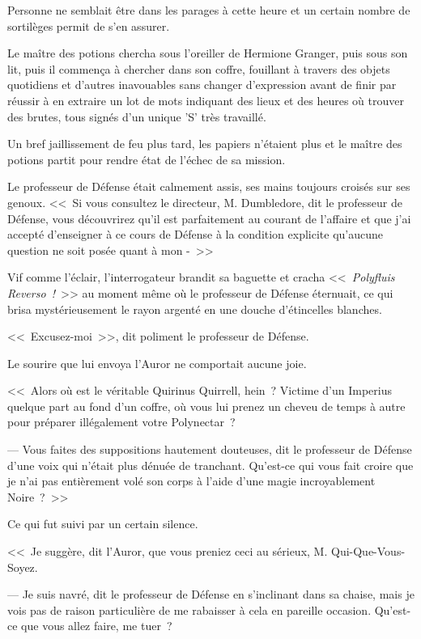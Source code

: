 Personne ne semblait être dans les parages à cette heure et un certain nombre de sortilèges permit de s'en assurer.

Le maître des potions chercha sous l'oreiller de Hermione Granger, puis sous son lit, puis il commença à chercher dans son coffre, fouillant à travers des objets quotidiens et d'autres inavouables sans changer d'expression avant de finir par réussir à en extraire un lot de mots indiquant des lieux et des heures où trouver des brutes, tous signés d'un unique 'S' très travaillé.

Un bref jaillissement de feu plus tard, les papiers n'étaient plus et le maître des potions partit pour rendre état de l'échec de sa mission.

\later

Le professeur de Défense était calmement assis, ses mains toujours croisés sur ses genoux. <<~Si vous consultez le directeur, M. Dumbledore, dit le professeur de Défense, vous découvrirez qu'il est parfaitement au courant de l'affaire et que j'ai accepté d'enseigner à ce cours de Défense à la condition explicite qu'aucune question ne soit posée quant à mon -~>>

Vif comme l'éclair, l'interrogateur brandit sa baguette et cracha <<~\emph{Polyfluis Reverso~!}~>> au moment même où le professeur de Défense éternuait, ce qui brisa mystérieusement le rayon argenté en une douche d'étincelles blanches.

<<~Excusez-moi~>>, dit poliment le professeur de Défense.

Le sourire que lui envoya l'Auror ne comportait aucune joie.

<<~Alors où est le véritable Quirinus Quirrell, hein~? Victime d'un Imperius quelque part au fond d'un coffre, où vous lui prenez un cheveu de temps à autre pour préparer illégalement votre Polynectar~?

--- Vous faites des suppositions hautement douteuses, dit le professeur de Défense d'une voix qui n'était plus dénuée de tranchant. Qu'est-ce qui vous fait croire que je n'ai pas entièrement volé son corps à l'aide d'une magie incroyablement Noire~?~>>

Ce qui fut suivi par un certain silence.

<<~Je suggère, dit l'Auror, que vous preniez ceci au sérieux, M. Qui-Que-Vous-Soyez.

--- Je suis navré, dit le professeur de Défense en s'inclinant dans sa chaise, mais je vois pas de raison particulière de me rabaisser à cela en pareille occasion. Qu'est-ce que vous allez faire, me tuer~?

